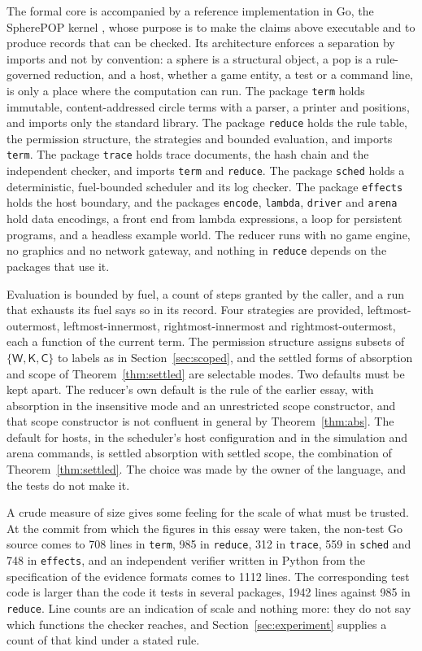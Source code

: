 \documentclass[11pt]{article}
\theoremstyle{definition}
\theoremstyle{remark}
\newcommand{\cC}{\mathsf{C}}
\newcommand{\cK}{\mathsf{K}}
\newcommand{\cW}{\mathsf{W}}
\begin{document}
The formal core is accompanied by a reference implementation in Go, the SpherePOP kernel \citep{kernel}, whose purpose is to make the claims above executable and to produce records that can be checked. Its architecture enforces a separation by imports and not by convention: a sphere is a structural object, a pop is a rule-governed reduction, and a host, whether a game entity, a test or a command line, is only a place where the computation can run. The package \texttt{term} holds immutable, content-addressed circle terms with a parser, a printer and positions, and imports only the standard library. The package \texttt{reduce} holds the rule table, the permission structure, the strategies and bounded evaluation, and imports \texttt{term}. The package \texttt{trace} holds trace documents, the hash chain and the independent checker, and imports \texttt{term} and \texttt{reduce}. The package \texttt{sched} holds a deterministic, fuel-bounded scheduler and its log checker. The package \texttt{effects} holds the host boundary, and the packages \texttt{encode}, \texttt{lambda}, \texttt{driver} and \texttt{arena} hold data encodings, a front end from lambda expressions, a loop for persistent programs, and a headless example world. The reducer runs with no game engine, no graphics and no network gateway, and nothing in \texttt{reduce} depends on the packages that use it.

Evaluation is bounded by fuel, a count of steps granted by the caller, and a run that exhausts its fuel says so in its record. Four strategies are provided, leftmost-outermost, leftmost-innermost, rightmost-innermost and rightmost-outermost, each a function of the current term. The permission structure assigns subsets of $\{\cW,\cK,\cC\}$ to labels as in Section~\ref{sec:scoped}, and the settled forms of absorption and scope of Theorem~\ref{thm:settled} are selectable modes. Two defaults must be kept apart. The reducer's own default is the rule of the earlier essay, with absorption in the insensitive mode and an unrestricted scope constructor, and that scope constructor is not confluent in general by Theorem~\ref{thm:abs}. The default for hosts, in the scheduler's host configuration and in the simulation and arena commands, is settled absorption with settled scope, the combination of Theorem~\ref{thm:settled}. The choice was made by the owner of the language, and the tests do not make it.

A crude measure of size gives some feeling for the scale of what must be trusted. At the commit from which the figures in this essay were taken, the non-test Go source comes to 708 lines in \texttt{term}, 985 in \texttt{reduce}, 312 in \texttt{trace}, 559 in \texttt{sched} and 748 in \texttt{effects}, and an independent verifier written in Python from the specification of the evidence formats comes to 1112 lines. The corresponding test code is larger than the code it tests in several packages, 1942 lines against 985 in \texttt{reduce}. Line counts are an indication of scale and nothing more: they do not say which functions the checker reaches, and Section~\ref{sec:experiment} supplies a count of that kind under a stated rule.
\end{document}
